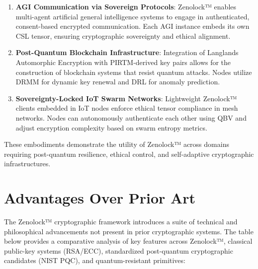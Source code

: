 \documentclass{article}
\theoremstyle{plain}
\begin{document}
\begin{enumerate}
  \item \textbf{AGI Communication via Sovereign Protocols}: Zenolock™ enables multi-agent artificial general intelligence systems to engage in authenticated, consent-based encrypted communication. Each AGI instance embeds its own CSL tensor, ensuring cryptographic sovereignty and ethical alignment.

  \item \textbf{Post-Quantum Blockchain Infrastructure}: Integration of Langlands Automorphic Encryption with PIRTM-derived key pairs allows for the construction of blockchain systems that resist quantum attacks. Nodes utilize DRMM for dynamic key renewal and DRL for anomaly prediction.

  \item \textbf{Sovereignty-Locked IoT Swarm Networks}: Lightweight Zenolock™ clients embedded in IoT nodes enforce ethical tensor compliance in mesh networks. Nodes can autonomously authenticate each other using QBV and adjust encryption complexity based on swarm entropy metrics.
\end{enumerate}

These embodiments demonstrate the utility of Zenolock™ across domains requiring post-quantum resilience, ethical control, and self-adaptive cryptographic infrastructures.
\section{Advantages Over Prior Art}

The Zenolock™ cryptographic framework introduces a suite of technical and philosophical advancements not present in prior cryptographic systems. The table below provides a comparative analysis of key features across Zenolock™, classical public-key systems (RSA/ECC), standardized post-quantum cryptographic candidates (NIST PQC), and quantum-resistant primitives:
\end{document}
